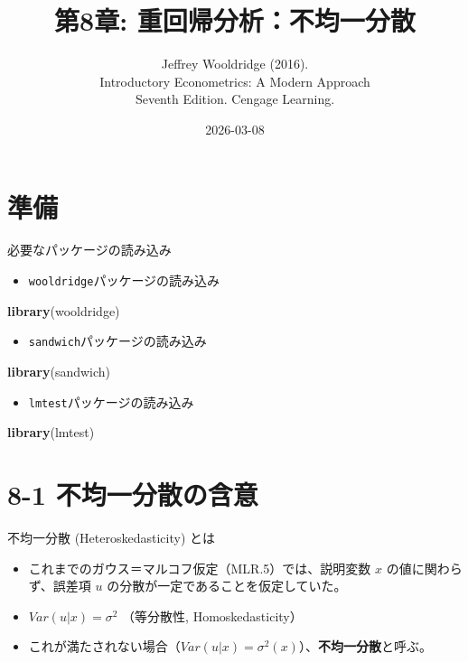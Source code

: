\documentclass[
  ignorenonframetext,
]{beamer}
\title{第8章: 重回帰分析：不均一分散}
\subtitle{Jeffrey Wooldridge (2016).\\
Introductory Econometrics: A Modern Approach\\
Seventh Edition. Cengage Learning.}
\author{}
\date{\vspace{-2.5em}2026-03-08}
\newenvironment{Shaded}{\begin{snugshade}}{\end{snugshade}}
\newcommand{\FunctionTok}[1]{\textcolor[rgb]{0.13,0.29,0.53}{\textbf{#1}}}
\newcommand{\NormalTok}[1]{#1}
\providecommand{\tightlist}{%
  \setlength{\itemsep}{0pt}\setlength{\parskip}{0pt}}
\begin{document}
\frame{\titlepage}

\section{準備}\label{ux6e96ux5099}

\begin{frame}[fragile]{必要なパッケージの読み込み}
\label{ux5fc5ux8981ux306aux30d1ux30c3ux30b1ux30fcux30b8ux306eux8aadux307fux8fbcux307f}
\begin{itemize}
\tightlist
\item
  \texttt{wooldridge}パッケージの読み込み
\end{itemize}

\begin{Shaded}
\begin{Highlighting}[]
\FunctionTok{library}\NormalTok{(wooldridge)}
\end{Highlighting}
\end{Shaded}

\begin{itemize}
\tightlist
\item
  \texttt{sandwich}パッケージの読み込み
\end{itemize}

\begin{Shaded}
\begin{Highlighting}[]
\FunctionTok{library}\NormalTok{(sandwich)}
\end{Highlighting}
\end{Shaded}

\begin{itemize}
\tightlist
\item
  \texttt{lmtest}パッケージの読み込み
\end{itemize}

\begin{Shaded}
\begin{Highlighting}[]
\FunctionTok{library}\NormalTok{(lmtest)}
\end{Highlighting}
\end{Shaded}
\end{frame}

\section{8-1
不均一分散の含意}\label{ux4e0dux5747ux4e00ux5206ux6563ux306eux542bux610f}

\begin{frame}{不均一分散 (Heteroskedasticity) とは}
\label{ux4e0dux5747ux4e00ux5206ux6563-heteroskedasticity-ux3068ux306f}
\begin{itemize}
\tightlist
\item
  これまでのガウス＝マルコフ仮定（MLR.5）では、説明変数 \(x\)
  の値に関わらず、誤差項 \(u\) の分散が一定であることを仮定していた。
\item
  \(Var(u|x) = \sigma^2\) （等分散性, Homoskedasticity）
\item
  これが満たされない場合（\(Var(u|x) = \sigma^2(x)\)）、\textbf{不均一分散}と呼ぶ。
\end{itemize}
\end{frame}
\end{document}
